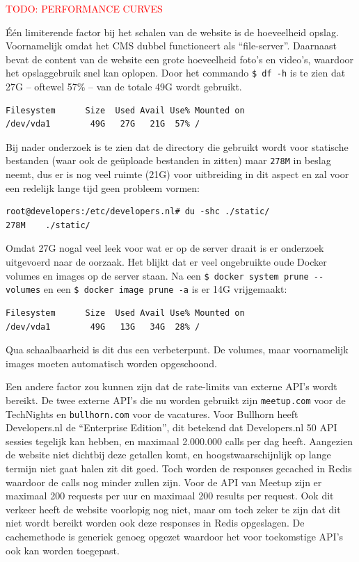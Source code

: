 \textcolor{red}{TODO: PERFORMANCE CURVES} %

Één limiterende factor bij het schalen van de website is de hoeveelheid opslag. Voornamelijk omdat het CMS dubbel functioneert als \enquote{file-server}. Daarnaast bevat de content van de website een grote hoeveelheid foto's en video's, waardoor het opslaggebruik snel kan oplopen. Door het commando \texttt{\$ df -h} is te zien dat 27G -- oftewel 57\% -- van de totale 49G wordt gebruikt.
\begin{verbatim}
Filesystem      Size  Used Avail Use% Mounted on
/dev/vda1        49G   27G   21G  57% /
\end{verbatim}
Bij nader onderzoek is te zien dat de directory die gebruikt wordt voor statische bestanden (waar ook de geüploade bestanden in zitten) maar \texttt{278M} in beslag neemt, dus er is nog veel ruimte (21G) voor uitbreiding in dit aspect en zal voor een redelijk lange tijd geen probleem vormen:
\begin{verbatim}
root@developers:/etc/developers.nl# du -shc ./static/
278M	./static/
\end{verbatim}

Omdat 27G nogal veel leek voor wat er op de server draait is er onderzoek uitgevoerd naar de oorzaak. Het blijkt dat er veel ongebruikte oude Docker volumes en images op de server staan. Na een \texttt{\$ docker system prune -\--volumes} en een \texttt{\$ docker image prune -a} is er 14G vrijgemaakt:
\begin{verbatim}
Filesystem      Size  Used Avail Use% Mounted on
/dev/vda1        49G   13G   34G  28% /
\end{verbatim}
Qua schaalbaarheid is dit dus een verbeterpunt. De volumes, maar voornamelijk images moeten automatisch worden opgeschoond.

Een andere factor zou kunnen zijn dat de rate-limits van externe API's wordt bereikt. De twee externe API's die nu worden gebruikt zijn \texttt{meetup.com} voor de TechNights en \texttt{bullhorn.com} voor de vacatures. Voor Bullhorn heeft Developers.nl de \enquote{Enterprise Edition}, dit betekend dat Developers.nl 50 API sessies tegelijk kan hebben, en maximaal 2.000.000 calls per dag heeft. Aangezien de website niet dichtbij deze getallen komt, en hoogstwaarschijnlijk op lange termijn niet gaat halen zit dit goed. Toch worden de responses gecached in Redis waardoor de calls nog minder zullen zijn. Voor de API van Meetup zijn er maximaal 200 requests per uur en maximaal 200 results per request. Ook dit verkeer heeft de website voorlopig nog niet, maar om toch zeker te zijn dat dit niet wordt bereikt worden ook deze responses in Redis opgeslagen. De cachemethode is generiek genoeg opgezet waardoor het voor toekomstige API's ook kan worden toegepast.

